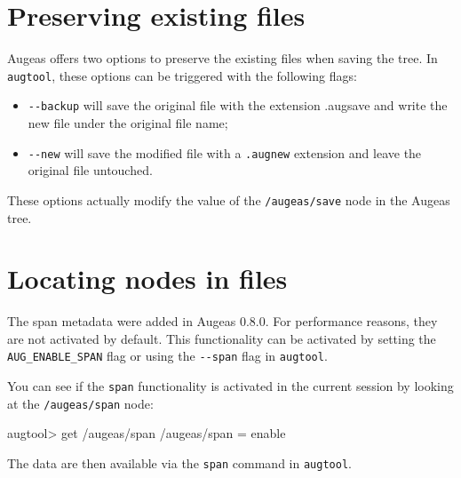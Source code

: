 \section{Preserving existing files}

  

Augeas offers two options to preserve the existing files when saving the tree. In \verb!augtool!, these options can be triggered with the following flags:

\begin{itemize}
\item
  \verb!--backup! will save the original file with the extension .augsave and write the new file under the original file name;
\item
  \verb!--new! will save the modified file with a \verb!.augnew! extension and leave the original file untouched.
\end{itemize}

These options actually modify the value of the \texttt{/augeas/save} node in the Augeas tree.

\section{Locating nodes in files}

\label{sec:locating_nodes}  

The span metadata were added in Augeas 0.8.0. For performance reasons, they are not activated by default. This functionality can be activated by setting the \verb!AUG_ENABLE_SPAN! flag or using the \verb!--span! flag in \verb!augtool!.

You can see if the \verb!span! functionality is activated in the current session by looking at the \texttt{/augeas/span} node:


\begin{augtoolsh}[]
augtool> get /augeas/span
/augeas/span = enable
\end{augtoolsh}

The data are then available via the \verb!span! command in \verb!augtool!.



